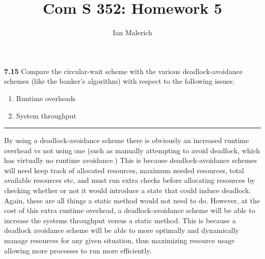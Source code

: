 \documentclass[12pt]{jhwhw}
\author{Ian Malerich}
\title{Com S 352: Homework 5}
\begin{document}
\raggedright

\textbf{7.15}  
	Compare the circular-wait scheme with the various deadlock-avoidance schemes 
	(like the banker's algorithm) with respect to the following issues:
	\begin{enumerate}
		\item Runtime overheads
		\item System throughput
	\end{enumerate}
\textcolor[RGB]{240,240,240}{\rule{\textwidth}{0.5pt}}\bigbreak

	\begin{addmargin}[1em]{}
		By using a deadlock-avoidance scheme there is obviously an increased runtime overhead
		vs not using one (such as manually attempting to avoid deadlock, which has virtually no
		runtime avoidance.) This is because deadlock-avoidance schemes will need keep track of 
		allocated resources, maximum needed resources, total available resources etc, and must
		run extra checks before allocating resources by checking whether or not it would introduce
		a state that could induce deadlock. Again, these are all things a static method would not
		need to do.
		\bigbreak
		However, at the cost of this extra runtime overhead, a deadlock-avoidance scheme will be
		able to increase the systems throughput versus a static method. This is because a 
		deadlock avoidance scheme will be able to more optimally and dynamically manage resources
		for any given situation, thus maximizing resource usage allowing more processes to run
		more efficiently.
	\end{addmargin}
\end{document}
